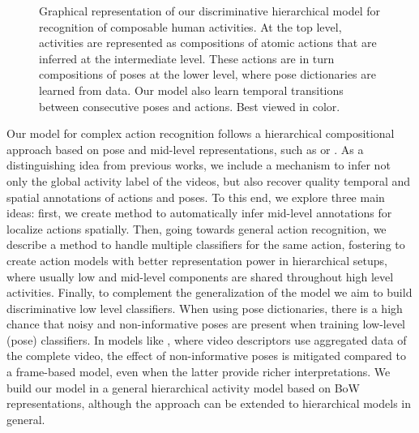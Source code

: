 \begin{figure}[tb]
\begin{center}
\fbox{\rule{0pt}{2in} \rule{0.9\linewidth}{0pt}}
\end{center}
   \caption{Graphical representation of our discriminative hierarchical model for recognition of composable human activities.
At the top level, activities are represented as compositions of atomic actions that are inferred at
the intermediate level. These actions are in turn compositions of poses at the
lower level, where pose dictionaries are learned from data. Our model also learn
temporal transitions between consecutive poses and actions. Best viewed in
color.}
\label{fig:overview}

\end{figure}


Our model for complex action recognition follows a hierarchical compositional approach based on pose and mid-level representations, such as \cite{Lillo2014} or \cite{Tao2015} .  As a distinguishing idea from previous works, we include a mechanism to infer not only the global activity label of the videos, but also recover quality temporal and spatial annotations of actions and poses. To this end, we explore three main ideas: first, we create method to automatically infer mid-level annotations for localize actions spatially. Then, going towards general action recognition, we describe a method to handle multiple classifiers for the same action, fostering to create action models with better representation power in hierarchical setups, where usually low and mid-level components are shared throughout high level activities. Finally, to complement the generalization of the model we aim to build discriminative low level classifiers. When using pose dictionaries, there is a high chance that noisy and non-informative poses are present when training low-level (pose) classifiers. In models like  \cite{Tao2015}, where  video descriptors use aggregated data of the complete video, the effect of non-informative poses is mitigated compared to a frame-based model, even when the latter provide richer interpretations. We build our model in a general hierarchical activity model based on BoW representations, although the approach can be extended to hierarchical models in general. 







